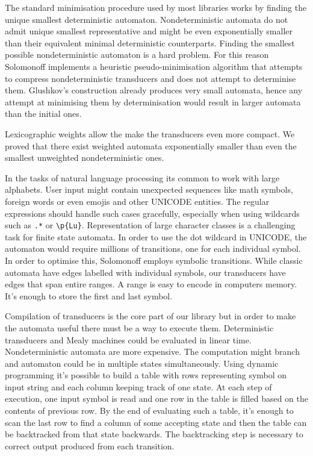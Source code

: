 The standard minimisation procedure used by most libraries works by finding the unique smallest deterministic automaton. Nondeterministic automata do not admit unique smallest representative and might be even exponentially smaller than their equivalent minimal deterministic counterparts. Finding the smallest possible nondeterministic automaton is a hard problem. For this reason Solomonoff implements a heuristic pseudo-minimisation algorithm that attempts to compress nondeterministic transducers and does not attempt to determinise them. Glushkov's construction already produces very small automata, hence any attempt at minimising them by determinisation would result in larger automata than the initial ones.

Lexicographic weights allow the make the transducers even more compact. We proved that there exist weighted automata exponentially smaller than even the smallest unweighted nondeterministic ones. 

In the tasks of natural language processing its common to work with large alphabets. User input might contain unexpected sequences like math symbols, foreign words or even emojis and other UNICODE entities. The regular expressions should handle such cases gracefully, especially when using wildcards such as \texttt{.*} or \texttt{\textbackslash p\{Lu\}}. Representation of large character classes is a challenging task for finite state automata. In order to use the dot wildcard in UNICODE, the automaton would require millions of transitions, one for each individual symbol. 
In order to optimise this, Solomonoff employs symbolic transitions. While classic automata have edges labelled with individual symbols, our transducers have edges that span entire ranges. A range is easy to encode in computers memory. It's enough to store the first and last symbol. 

Compilation of transducers is the core part of our library but in order to make the automata useful there must be a way to execute them. Deterministic transducers and Mealy machines could be evaluated in linear time. Nondeterministic automata are more expensive. The computation might branch and automaton could be in multiple states simultaneously. Using dynamic programming it's possible to build a table with rows representing symbol on input string and each column keeping track of one state. 
At each step of execution, one input symbol is read and one row in the table is filled based on the contents of previous row. By the end of evaluating such a table, it's enough to scan the last row to find a column of some accepting state and then the table can be backtracked from that state backwards. The backtracking step is necessary to correct output produced from each transition. 

